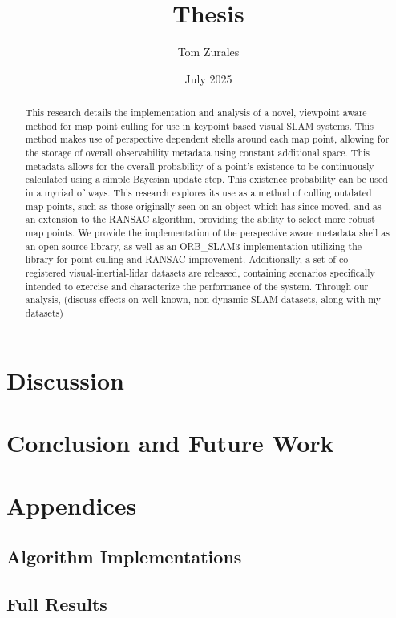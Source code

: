 \documentclass[12pt]{article}
\title{Thesis}
\author{Tom Zurales}
\date{July 2025}
\begin{document}
\doublespace

\maketitle

\newpage

\begin{abstract}
  This research details the implementation and analysis of a novel, viewpoint aware method for map point culling for use in keypoint based visual SLAM systems. This method makes use of perspective dependent shells around each map point, allowing for the storage of overall observability metadata using constant additional space. This metadata allows for the overall probability of a point's existence to be continuously calculated using a simple Bayesian update step. This existence probability can be used in a myriad of ways. This research explores its use as a method of culling outdated map points, such as those originally seen on an object which has since moved, and as an extension to the RANSAC algorithm, providing the ability to select more robust map points. We provide the implementation of the perspective aware metadata shell as an open-source library, as well as an ORB\_SLAM3 implementation utilizing the library for point culling and RANSAC improvement. Additionally, a set of co-registered visual-inertial-lidar datasets are released, containing scenarios specifically intended to exercise and characterize the performance of the system. Through our analysis, (discuss effects on well known, non-dynamic SLAM datasets, along with my datasets)
\end{abstract}

\newpage

\tableofcontents










\section{Discussion}

\section{Conclusion and Future Work}

\section*{Appendices}

\subsection*{Algorithm Implementations}

\subsection*{Full Results}
\end{document}

